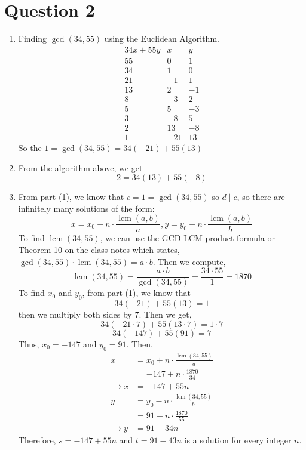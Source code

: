 \documentclass{report}
\DeclareMathOperator{\lcm}{lcm}
\begin{document}
\section*{Question 2}
\begin{enumerate}
    \item Finding \(\gcd(34,55)\) using the Euclidean Algorithm.
          \[
              \begin{array}{r|rr}
                  34x + 55y & x   & y  \\
                  \hline
                  55        & 0   & 1  \\
                  34        & 1   & 0  \\
                  21        & -1  & 1  \\
                  13        & 2   & -1 \\
                  8         & -3  & 2  \\
                  5         & 5   & -3 \\
                  3         & -8  & 5  \\
                  2         & 13  & -8 \\
                  1         & -21 & 13
              \end{array}
          \]
          So  the \(1 = \gcd(34,55) = 34(-21) + 55(13)\)
    \item From the algorithm above, we get \[2 = 34(13) + 55(-8)\]
    \item From part (1), we know that \(c = 1 = \gcd(34,55)\) so \(d \mid c\),
          so there are infinitely many solutions of the form:
          \[x = x_0 + n \cdot \frac{\lcm(a,b)}{a}, y = y_0 - n \cdot \frac{\lcm(a,b)}{b}\]
          To find \(\lcm(34,55)\), we can use the GCD-LCM product formula or Theorem 10 on the class notes which states,
          \(\gcd(34,55) \cdot \lcm(34,55) = a \cdot b\). Then we compute,
          \[\lcm(34,55) = \frac{a\cdot b}{\gcd(34,55)} = \frac{34 \cdot 55}{1} = 1870\]
          To find \(x_0\) and \(y_0\), from part (1), we know that \[34(-21) + 55(13) = 1\] then we multiply both sides by \(7\).
          Then we get, \[34 ( -21 \cdot 7) + 55( 13\cdot7) = 1 \cdot 7\]\[ 34(-147) + 55(91) = 7\]
          Thus, \(x_0 = -147\) and \(y_0 = 91\). Then,
          \begin{align*}
              x             & = x_0 + n\cdot\frac{\lcm(34,55)}{a} \\
                            & = -147 + n \cdot \frac{1870}{34}    \\
              \rightarrow x & = -147 + 55n                        \\
              y             & = y_0 - n\cdot\frac{\lcm(34,55)}{b} \\
                            & = 91 - n\cdot\frac{1870}{55}        \\
              \rightarrow y & = 91-34n
          \end{align*}
          Therefore, \(s = -147 + 55n\) and \(t = 91-43n\) is a solution for
          every integer \(n\).
\end{enumerate}
\end{document}
